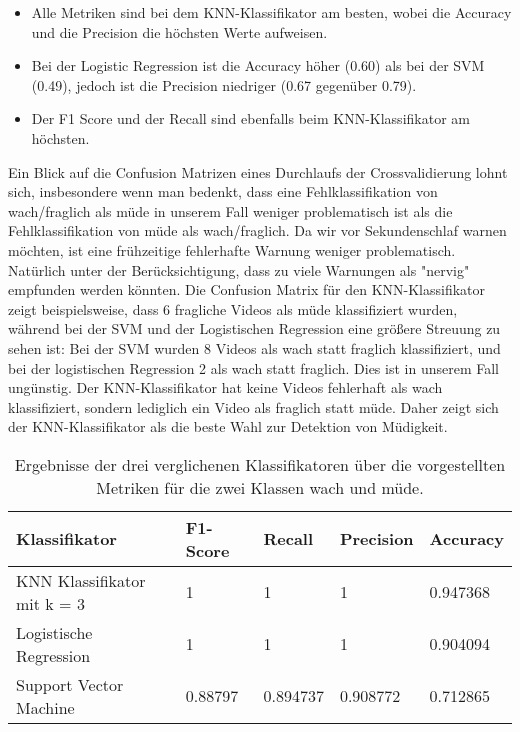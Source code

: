 \begin{itemize}
\item Alle Metriken sind bei dem KNN-Klassifikator am besten, wobei die Accuracy und die Precision die höchsten Werte aufweisen.
\item Bei der Logistic Regression ist die Accuracy höher (0.60) als bei der SVM (0.49), jedoch ist die Precision niedriger (0.67 gegenüber 0.79).
\item Der F1 Score und der Recall sind ebenfalls beim KNN-Klassifikator am höchsten.
\end{itemize}

Ein Blick auf die Confusion Matrizen eines Durchlaufs der Crossvalidierung lohnt sich, insbesondere wenn man bedenkt, dass eine Fehlklassifikation von wach/fraglich als müde in unserem Fall weniger problematisch ist als die Fehlklassifikation von müde als wach/fraglich. Da wir vor Sekundenschlaf warnen möchten, ist eine frühzeitige fehlerhafte Warnung weniger problematisch. Natürlich unter der Berücksichtigung, dass zu viele Warnungen als "nervig" empfunden werden könnten. Die Confusion Matrix für den KNN-Klassifikator zeigt beispielsweise, dass 6 fragliche Videos als müde klassifiziert wurden, während bei der SVM und der Logistischen Regression eine größere Streuung zu sehen ist: Bei der SVM wurden 8 Videos als wach statt fraglich klassifiziert, und bei der logistischen Regression 2 als wach statt fraglich. Dies ist in unserem Fall ungünstig. Der KNN-Klassifikator hat keine Videos fehlerhaft als wach klassifiziert, sondern lediglich ein Video als fraglich statt müde. Daher zeigt sich der KNN-Klassifikator als die beste Wahl zur Detektion von Müdigkeit.

\begin{table}
    \centering
    \begin{tabular}{|l|l|l|l|l|}
    \hline
        {Klassifikator} & {F1-Score} & {Recall} & {Precision} & {Accuracy} \\ \hline
        {KNN Klassifikator mit k = 3} & 1 & 1 & 1 & 0.947368 \\ \hline
        {Logistische Regression} & 1 & 1 & 1 & 0.904094 \\ \hline
        {Support Vector Machine} & 0.88797 & 0.894737 & 0.908772 & 0.712865 \\ \hline
    \end{tabular}
\caption{Ergebnisse der drei verglichenen Klassifikatoren über die vorgestellten Metriken für die zwei Klassen wach und müde.}
\label{table:twoclassificator}
\end{table}

